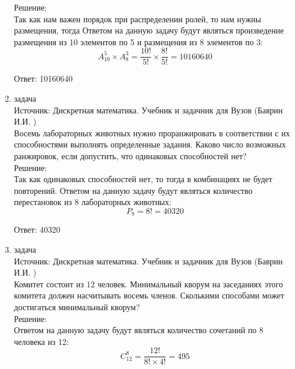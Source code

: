 \documentclass[a4paper,14pt]{extreport} %
\begin{document}
\begin{center}
\begin{enumerate}
						 Решение:\\
						 Так как нам важен порядок при распределении ролей, то нам нужны размещения, тогда 
						 Ответом на данную задачу будут являться произведение размещения из 10 элементов по 5 и размещения из 8 элементов по 3:
						 \begin{equation}
						 	A_{10}^5\times A_{8}^3 = \frac{10!}{5!}\times\frac{8!}{5!}= 10160640
						 \end{equation}
						 
						 Ответ: 10160640
						 
						 \item {\large задача  }\\
						 Источник: Дискретная математика. Учебник и задачник для Вузов (Баврин И.И. )\\
						 \vspace{15pt}
						 Восемь лабораторных животных нужно проранжировать в соответствии с их способностями выполнять определенные задания. Каково число возможных ранжировок, если допустить, что одинаковых способностей нет?\\
						 \vspace{15pt}
						 Решение:\\
						 Так как одинаковых способностей нет, то тогда в комбинациях не будет повторений. 
						 Ответом на данную задачу будут являться количество перестановок из 8 лабораторных животных:
						 \begin{equation}
						 	P_{8} = 8! = 40320
						 \end{equation}
						 
						 Ответ: 40320
						 
						 \item {\large задача  }\\
						 Источник: Дискретная математика. Учебник и задачник для Вузов (Баврин И.И. )\\
						 \vspace{15pt}
						 Комитет состоит из 12 человек. Минимальный кворум на заседаниях этого комитета должен насчитывать восемь членов. Сколькими способами может достигаться минимальный кворум?\\
						 \vspace{15pt}
						 Решение:\\
						 Ответом на данную задачу будут являться количество сочетаний по 8 человека из 12:
						 \begin{equation}
						 	C_{12}^8 =\frac{12!}{8!\times4!} = 495
						 \end{equation}
						 

\end{enumerate}
\end{center}
\end{document}
